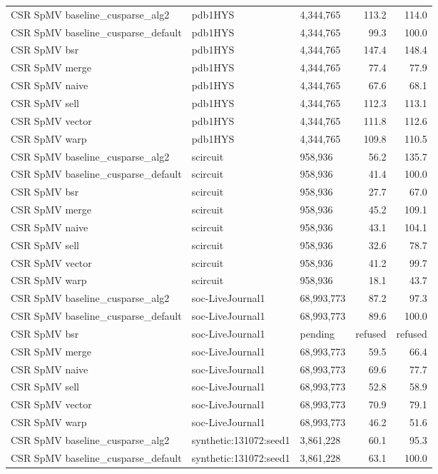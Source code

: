 \begin{tabular}{lllrr}
CSR SpMV baseline\_cusparse\_alg2 & pdb1HYS & 4,344,765 & 113.2 & 114.0 \\
CSR SpMV baseline\_cusparse\_default & pdb1HYS & 4,344,765 & 99.3 & 100.0 \\
CSR SpMV bsr & pdb1HYS & 4,344,765 & 147.4 & 148.4 \\
CSR SpMV merge & pdb1HYS & 4,344,765 & 77.4 & 77.9 \\
CSR SpMV naive & pdb1HYS & 4,344,765 & 67.6 & 68.1 \\
CSR SpMV sell & pdb1HYS & 4,344,765 & 112.3 & 113.1 \\
CSR SpMV vector & pdb1HYS & 4,344,765 & 111.8 & 112.6 \\
CSR SpMV warp & pdb1HYS & 4,344,765 & 109.8 & 110.5 \\
CSR SpMV baseline\_cusparse\_alg2 & scircuit & 958,936 & 56.2 & 135.7 \\
CSR SpMV baseline\_cusparse\_default & scircuit & 958,936 & 41.4 & 100.0 \\
CSR SpMV bsr & scircuit & 958,936 & 27.7 & 67.0 \\
CSR SpMV merge & scircuit & 958,936 & 45.2 & 109.1 \\
CSR SpMV naive & scircuit & 958,936 & 43.1 & 104.1 \\
CSR SpMV sell & scircuit & 958,936 & 32.6 & 78.7 \\
CSR SpMV vector & scircuit & 958,936 & 41.2 & 99.7 \\
CSR SpMV warp & scircuit & 958,936 & 18.1 & 43.7 \\
CSR SpMV baseline\_cusparse\_alg2 & soc-LiveJournal1 & 68,993,773 & 87.2 & 97.3 \\
CSR SpMV baseline\_cusparse\_default & soc-LiveJournal1 & 68,993,773 & 89.6 & 100.0 \\
CSR SpMV bsr & soc-LiveJournal1 & pending & refused & refused \\
CSR SpMV merge & soc-LiveJournal1 & 68,993,773 & 59.5 & 66.4 \\
CSR SpMV naive & soc-LiveJournal1 & 68,993,773 & 69.6 & 77.7 \\
CSR SpMV sell & soc-LiveJournal1 & 68,993,773 & 52.8 & 58.9 \\
CSR SpMV vector & soc-LiveJournal1 & 68,993,773 & 70.9 & 79.1 \\
CSR SpMV warp & soc-LiveJournal1 & 68,993,773 & 46.2 & 51.6 \\
CSR SpMV baseline\_cusparse\_alg2 & synthetic:131072:seed1 & 3,861,228 & 60.1 & 95.3 \\
CSR SpMV baseline\_cusparse\_default & synthetic:131072:seed1 & 3,861,228 & 63.1 & 100.0 \\

\end{tabular}
